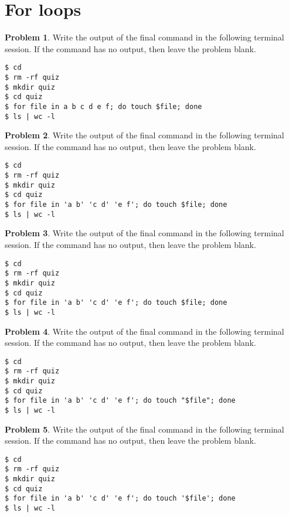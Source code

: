 \documentclass[10pt]{article}
\theoremstyle{definition}
\newtheorem{problem}{Problem}
\begin{document}
\section{For loops}

\begin{problem}
    Write the output of the final command in the following terminal session.
    If the command has no output, then leave the problem blank.
\end{problem}
\begin{lstlisting}
$ cd
$ rm -rf quiz
$ mkdir quiz
$ cd quiz
$ for file in a b c d e f; do touch $file; done
$ ls | wc -l
\end{lstlisting}
\vspace{0.4in}

\begin{problem}
    Write the output of the final command in the following terminal session.
    If the command has no output, then leave the problem blank.
\end{problem}
\begin{lstlisting}
$ cd
$ rm -rf quiz
$ mkdir quiz
$ cd quiz
$ for file in 'a b' 'c d' 'e f'; do touch $file; done
$ ls | wc -l
\end{lstlisting}
\vspace{0.4in}

\begin{problem}
    Write the output of the final command in the following terminal session.
    If the command has no output, then leave the problem blank.
\end{problem}
\begin{lstlisting}
$ cd
$ rm -rf quiz
$ mkdir quiz
$ cd quiz
$ for file in 'a b' 'c d' 'e f'; do touch $file; done
$ ls | wc -l
\end{lstlisting}
\vspace{0.4in}

\begin{problem}
    Write the output of the final command in the following terminal session.
    If the command has no output, then leave the problem blank.
\end{problem}
\begin{lstlisting}
$ cd
$ rm -rf quiz
$ mkdir quiz
$ cd quiz
$ for file in 'a b' 'c d' 'e f'; do touch "$file"; done
$ ls | wc -l
\end{lstlisting}
\vspace{0.4in}

\begin{problem}
    Write the output of the final command in the following terminal session.
    If the command has no output, then leave the problem blank.
\end{problem}
\begin{lstlisting}
$ cd
$ rm -rf quiz
$ mkdir quiz
$ cd quiz
$ for file in 'a b' 'c d' 'e f'; do touch '$file'; done
$ ls | wc -l
\end{lstlisting}
\vspace{0.4in}
\end{document}
